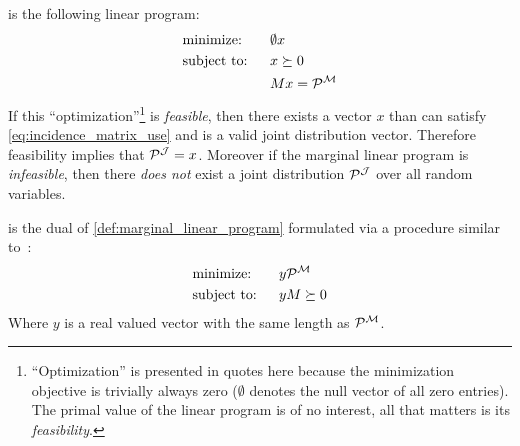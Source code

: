 \documentclass[aps, 10pt, english, twoside, pra, nofootinbib, longbibliography]{revtex4-1}
\begin{document}
    \begin{definition}
        \label{def:marginal_linear_program}
         is the following linear program:
        \begin{alignat*}{2}
            & \text{minimize:} \quad&& \emptyset \tcdot x\\
            & \text{subject to:} && x \succeq 0 \\
            & && M \tcdot x = \probvec^{\mscenario}
        \end{alignat*}
        If this ``optimization''\footnote{``Optimization'' is presented in quotes here because the minimization objective is trivially always zero ($\emptyset$ denotes the null vector of all zero entries). The primal value of the linear program is of no interest, all that matters is its \textit{feasibility}.} is \textit{feasible}, then there exists a vector $x$ than can satisfy \cref{eq:incidence_matrix_use} and is a valid joint distribution vector. Therefore feasibility implies that $\probvec^{\jointvar} = x$. Moreover if the marginal linear program is \textit{infeasible}, then there \textit{does not} exist a joint distribution $\probvec^{\jointvar}$ over all random variables.
    \end{definition}
    \begin{definition}
        \label{def:dual_marginal_linear_program}
         is the dual of \cref{def:marginal_linear_program} formulated via a procedure similar to~\cite{Lahaie_2008}:
        \begin{alignat*}{2}
            & \text{minimize:} \quad&& y \tcdot \probvec^{\mscenario}\\
            & \text{subject to:} && y \tcdot M \succeq 0
        \end{alignat*}
        Where $y$ is a real valued vector with the same length as $\probvec^{\mscenario}$.
    \end{definition}
\end{document}
